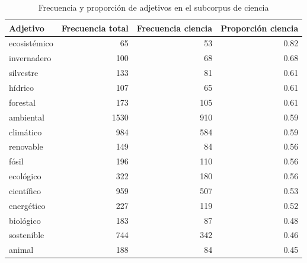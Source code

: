 \documentclass[11pt,a4paper]{article}
\begin{document}
\begin{table}[H]
	\centering
	\begin{tabular}{lrrr}
		\toprule
		\textbf{Adjetivo} & \textbf{Frecuencia total} & \textbf{Frecuencia ciencia} & \textbf{Proporción ciencia} \\
		\midrule
		ecosistémico & 65   & 53  & 0.82 \\
		invernadero  & 100  & 68  & 0.68 \\
		silvestre    & 133  & 81  & 0.61 \\
		hídrico      & 107  & 65  & 0.61 \\
		forestal     & 173  & 105 & 0.61 \\
		ambiental    & 1530 & 910 & 0.59 \\
		climático    & 984  & 584 & 0.59 \\
		renovable    & 149  & 84  & 0.56 \\
		fósil        & 196  & 110 & 0.56 \\
		ecológico    & 322  & 180 & 0.56 \\
		científico   & 959  & 507 & 0.53 \\
		energético   & 227  & 119 & 0.52 \\
		biológico    & 183  & 87  & 0.48 \\
		sostenible   & 744  & 342 & 0.46 \\
		animal       & 188  & 84  & 0.45 \\
		\bottomrule
	\end{tabular}
	\caption{Frecuencia y proporción de adjetivos en el subcorpus de ciencia}
	\label{tab:adjetivos_ciencia}
\end{table}
\end{document}
